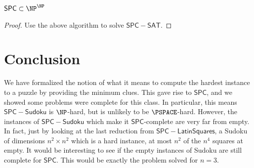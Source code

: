 \documentclass[runningheads,a4paper]{llncs}
\begin{document}
\begin{proposition}
$\mathsf{SPC} \subset \NP^\NP$
\end{proposition}

\begin{proof}
Use the above algorithm to solve $\mathsf{SPC-SAT}$. 
\end{proof}

\section{Conclusion}

We have formalized the notion of what it means to compute the hardest instance to a puzzle by providing the minimum clues. This gave rise to $\mathsf{SPC}$, and we showed some problems were complete for this class. In particular, this means $\mathsf{SPC-Sudoku}$ is $\NP$-hard, but is unlikely to be $\PSPACE$-hard. However, the instances of $\mathsf{SPC-Sudoku}$ which make it $\mathsf{SPC}$-complete are very far from empty. In fact, just by looking at the last reduction from $\mathsf{SPC-Latin Squares}$, a Sudoku of dimensions $n^2 \times n^2$ which is a hard instance, at most $n^2$ of the $n^4$ squares at empty. It would be interesting to see if the empty instances of Sudoku are still complete for $\mathsf{SPC}$. This would be exactly the problem \cite{mcguire2012there} solved for $n = 3$. 



\end{document}
